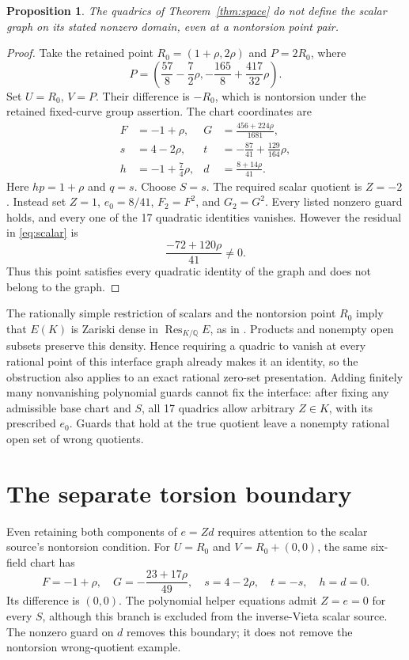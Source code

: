 \documentclass[11pt,a4paper]{article}
\newtheorem{proposition}[theorem]{Proposition}
\newcommand{\Q}{\mathbb Q}
\begin{document}
\begin{proposition}
The quadrics of Theorem~\ref{thm:space} do not define the scalar
graph on its stated nonzero domain, even at a nontorsion point pair.
\end{proposition}
\begin{proof}
Take the retained point $R_0=(1+\rho,2\rho)$ and $P=2R_0$,
where
\[
 P=\left(\frac{57}{8}-\frac72\rho,
           -\frac{165}{8}+\frac{417}{32}\rho\right).
\]
Set $U=R_0$, $V=P$. Their difference is $-R_0$, which is
nontorsion under the retained fixed-curve group assertion. The
chart coordinates are
\begin{align*}
 F&=-1+\rho,&G&=\frac{456+224\rho}{1681},\\
 s&=4-2\rho,&t&=-\frac{87}{41}+\frac{129}{164}\rho,\\
 h&=-1+\frac74\rho,&d&=\frac{8+14\rho}{41}.
\end{align*}
Here $hp=1+\rho$ and $q=s$. Choose $S=s$.
The required scalar quotient is $Z=-2$. Instead set $Z=1$,
$e_0=8/41$, $F_2=F^2$, and $G_2=G^2$.
Every listed nonzero guard holds, and every one of the 17 quadratic
identities vanishes. However the residual in \eqref{eq:scalar} is
\[
                       \frac{-72+120\rho}{41}\ne0.
\]
Thus this point satisfies every quadratic identity of the graph and
does not belong to the graph.
\end{proof}

The rationally simple restriction of scalars and the nontorsion
point $R_0$ imply that $E(K)$ is Zariski dense in
$\operatorname{Res}_{K/\Q}E$, as in \cite{Families}. Products and
nonempty open subsets preserve this density. Hence requiring a
quadric to vanish at every rational point of this interface graph
already makes it an identity, so the obstruction also applies to
an exact rational zero-set presentation. Adding finitely many
nonvanishing polynomial guards cannot fix the interface: after fixing
any admissible base chart and $S$, all 17 quadrics allow arbitrary
$Z\in K$, with its prescribed $e_0$. Guards that hold at the true
quotient leave a nonempty rational open set of wrong quotients.

\section{The separate torsion boundary}

Even retaining both components of $e=Zd$ requires attention to the
scalar source's nontorsion condition. For $U=R_0$ and
$V=R_0+(0,0)$, the same six-field chart has
\[
 F=-1+\rho,\quad G=-\frac{23+17\rho}{49},\quad
 s=4-2\rho,\quad t=-s,\quad h=d=0.
\]
Its difference is $(0,0)$. The polynomial helper equations admit
$Z=e=0$ for every $S$, although this branch is excluded from the
inverse-Vieta scalar source. The nonzero guard on $d$ removes this
boundary; it does not remove the nontorsion wrong-quotient example.
\end{document}
